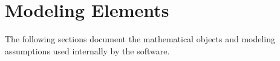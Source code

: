 \section{Modeling Elements}

The following sections document the mathematical objects and modeling assumptions used internally by the software.

